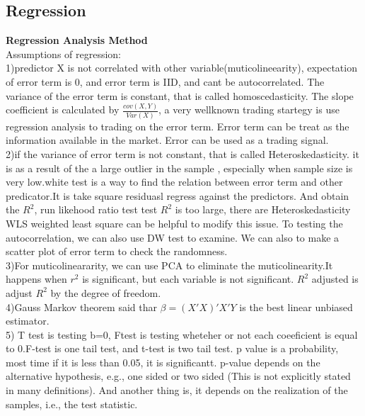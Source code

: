 \documentclass[a4paper,11pt]{article}
\begin{document}
\subsection{Regression}
{\bf Regression Analysis Method}\\
Assumptions of regression:\\
 1)predictor X is not correlated with other variable(muticolineearity), expectation of error term is 0, and error term is IID, and cant be autocorrelated. The variance of the error term is constant, that is called homoscedasticity. The slope coefficient is calculated by $\frac{cov(X,Y)}{Var(X)}$, a very wellknown trading startegy is use regression analysis to trading on the error term. Error term can be treat as the information available in the market. Error can be used as a trading signal.\\
2)if the variance of error term is not constant, that is called Heteroskedasticity. it is as a result of the a large outlier in the sample , especially when sample size is very low.white test is a way to find the relation between error term and other predicator.It is take square residuasl regress against the predictors. And obtain the $R^2$, run likehood ratio test test $R^2$ is too large, there are Heteroskedasticity
WLS weighted least square can be helpful to modify this issue.
To testing the autocorrelation, we can also use DW test to examine. We can also to make a scatter plot of error term to check the randomness. \\
3)For muticolineararity, we can use PCA to eliminate the muticolinearity.It happens when $r^2$ is significant, but each variable is not significant. $R^2$ adjusted is adjust $R^2$ by the degree of freedom. \\

4)Gauss Markov theorem said thar $\beta=(X'X)' X'Y$ is the best linear unbiased estimator.\\
5) T test is testing b=0, Ftest is testing wheteher or not each coeeficient is equal to 0.F-test is one tail test, and t-test is two tail test. p value is a probability, most time if it is less than 0.05, it is significantt.
p-value depends on the alternative hypothesis, e.g., one sided or two sided (This is not explicitly stated in
many definitions). And another thing is, it depends on the realization of the samples, i.e., the test statistic.
\end{document}
